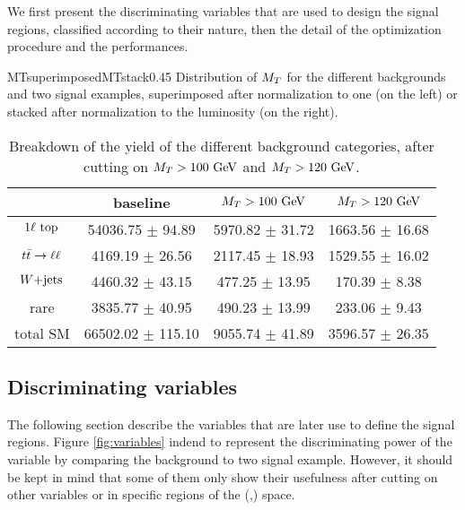     We first present the discriminating variables that are used to design the signal regions, classified
    according to their nature, then the detail of the optimization procedure and the performances.

                     {MTsuperimposed}{MTstack}{0.45}
                     {Distribution of $M_T$ for the different backgrounds and two signal examples,
                     superimposed after normalization to one (on the left) or stacked after normalization to the luminosity (on the right).}

    \begin{table}[h!]
        \centering
        \begin{tabular}{|c|ccc|}
            \hline
                         & baseline                 & $M_T > 100 ~\text{GeV}$          & $M_T > 120 ~\text{GeV}$           \\
            \hline
        $1\ell~\text{top}$  & 54036.75 $\pm$ 94.89     &  5970.82 $\pm$ 31.72      &  1663.56 $\pm$ 16.68       \\
        $t\bar{t} \rightarrow \ell \ell$   &  4169.19 $\pm$ 26.56     &  2117.45 $\pm$ 18.93      &  1529.55 $\pm$ 16.02       \\
        $\text{$W$+jets}$         &  4460.32 $\pm$ 43.15     &   477.25 $\pm$ 13.95      &   170.39 $\pm$ 8.38        \\
        rare             &  3835.77 $\pm$ 40.95     &   490.23 $\pm$ 13.99      &   233.06 $\pm$ 9.43        \\
            \hline
        total SM         & 66502.02 $\pm$ 115.10    &  9055.74 $\pm$ 41.89      & 3596.57 $\pm$ 26.35        \\
            \hline
        \end{tabular}
        \caption{Breakdown of the yield of the different background categories, after cutting on $M_T > 100 ~\text{GeV}$ and $M_T > 120 ~\text{GeV}$.}
        \label{tab:MTcutImpact}
    \end{table}

        \subsection{Discriminating variables}

        The following section describe the variables that are later use to define the signal regions. Figure \ref{fig:variables} indend to represent the discriminating power of the variable by comparing the background to two signal example. However, it should be kept in mind that some of them only show their usefulness after cutting on other variables or in specific regions of the (\mass{\lstop},\mass{\lneutralino}) space.

